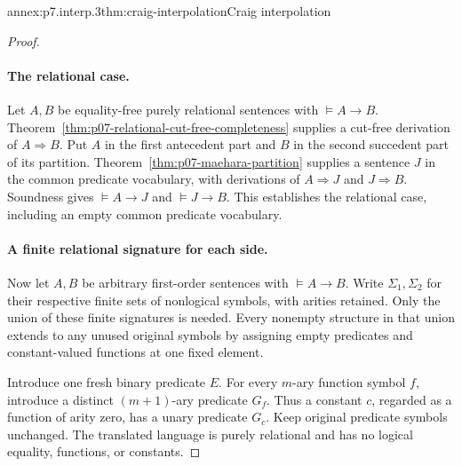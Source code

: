 \begin{annexitem}{annex:p7.interp.3}{thm:craig-interpolation}{Craig interpolation}
\begin{proof}
\paragraph{The relational case.}
Let \(A,B\) be equality-free purely relational sentences with
\(\models A\to B\).
Theorem~\ref{thm:p07-relational-cut-free-completeness} supplies a
cut-free derivation of \(A\Rightarrow B\).
Put \(A\) in the first antecedent part and \(B\) in the second
succedent part of its partition.
Theorem~\ref{thm:p07-maehara-partition} supplies a sentence \(J\)
in the common predicate vocabulary, with derivations of
\(A\Rightarrow J\) and \(J\Rightarrow B\).
Soundness gives \(\models A\to J\) and \(\models J\to B\).
This establishes the relational case, including an empty common
predicate vocabulary.

\paragraph{A finite relational signature for each side.}
Now let \(A,B\) be arbitrary first-order sentences with
\(\models A\to B\).
Write \(\Sigma_1,\Sigma_2\) for their respective finite sets of
nonlogical symbols, with arities retained.
Only the union of these finite signatures is needed.
Every nonempty structure in that union extends to any unused
original symbols by assigning empty predicates and constant-valued
functions at one fixed element.

Introduce one fresh binary predicate \(E\).
For every \(m\)-ary function symbol \(f\), introduce a distinct
\((m+1)\)-ary predicate \(G_f\).  Thus a constant \(c\), regarded
as a function of arity zero, has a unary predicate \(G_c\).
Keep original predicate symbols unchanged.
The translated language is purely relational and has no logical
equality, functions, or constants.


\end{proof}
\end{annexitem}
